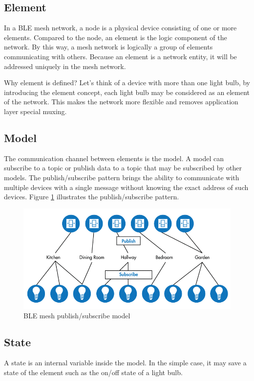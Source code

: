 \documentclass[\main/main.tex]{subfiles}
\begin{document}
\subsection{Element}
In a BLE mesh network, a node is a physical device consisting of one or more elements. Compared to the node, an element is the logic component of the network. By this way, a mesh network is logically a group of elements communicating with others. Because an element is a network entity, it will be addressed uniquely in the mesh network.

Why element is defined? Let's think of a device with more than one light bulb, by introducing the element concept, each light bulb may be considered as an element of the network. This makes the network more flexible and removes application layer special muxing.

\subsection{Model}
The communication channel between elements is the model. A model can subscribe to a topic or publish data to a topic that may be subscribed by other models. The publish/subscribe pattern brings the ability to  communicate with multiple devices with a single message without knowing the exact address of such devices. Figure \ref{fig:BLE mesh publish/subscribe model} illustrates the publish/subscribe pattern. 

\begin{figure}[H]
    \begin{center}
        \includegraphics[scale=0.4]{ble_mesh_pub_sub.png}
    \end{center}
    \caption{BLE mesh publish/subscribe model}
    \label{fig:BLE mesh publish/subscribe model}
\end{figure}

\subsection{State}
A state is an internal variable inside the model. In the simple case, it may save a state of the element such as the on/off state of a light bulb.
\end{document}
